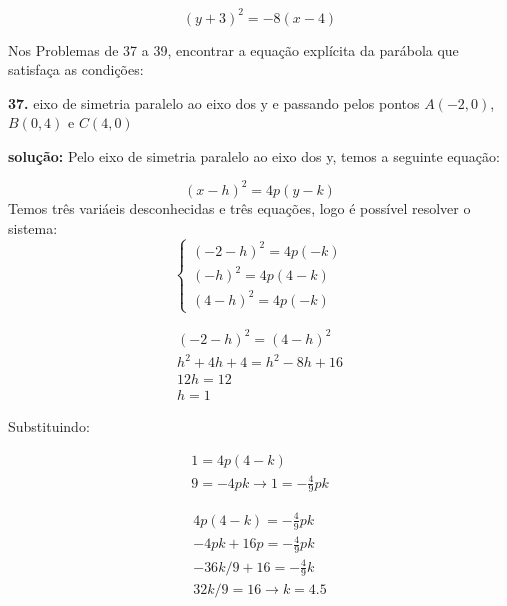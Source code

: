 \begin{equation}
    (y+3)^2 = -8(x-4)
\end{equation}

Nos Problemas de 37 a 39, encontrar a equação explícita da parábola que satisfaça as condições:

\textbf{37.} eixo de simetria paralelo ao eixo dos y e passando pelos pontos $A(-2, 0)$, $B(0, 4)$ 
e $C(4, 0)$

\textbf{solução:} Pelo eixo de simetria paralelo ao eixo dos y, temos a seguinte equação:

\begin{equation}
    (x-h)^2 = 4p(y-k)
\end{equation}
Temos três variáeis desconhecidas e três equações, logo é possível resolver o sistema:
\begin{equation}
        \left\{
            \begin{split}
                (-2-h)^2 = 4p(-k) \\
                (-h)^2 = 4p(4-k) \\
                (4-h)^2 = 4p(-k)
            \end{split}
        \right.
\end{equation}

\begin{equation}
    \begin{split}
        (-2-h)^2 = (4-h)^2 \\
        h^2 + 4h + 4 = h^2 -8h + 16 \\
        12h = 12 \\
        h = 1
    \end{split}
\end{equation}

Substituindo:

\begin{equation}
    \begin{split}
        1 = 4p(4-k) \\
        9 = -4pk \longrightarrow 1 = -\frac{4}{9}pk
    \end{split}
\end{equation}

\begin{equation}
    \begin{split}
        4p(4-k) = -\frac{4}{9}pk \\
        -4pk + 16p = -\frac{4}{9}pk \\
        -36k/9 + 16 = -\frac{4}{9}k \\
        32k/9 = 16 \rightarrow k = 4.5
    \end{split}
\end{equation}

